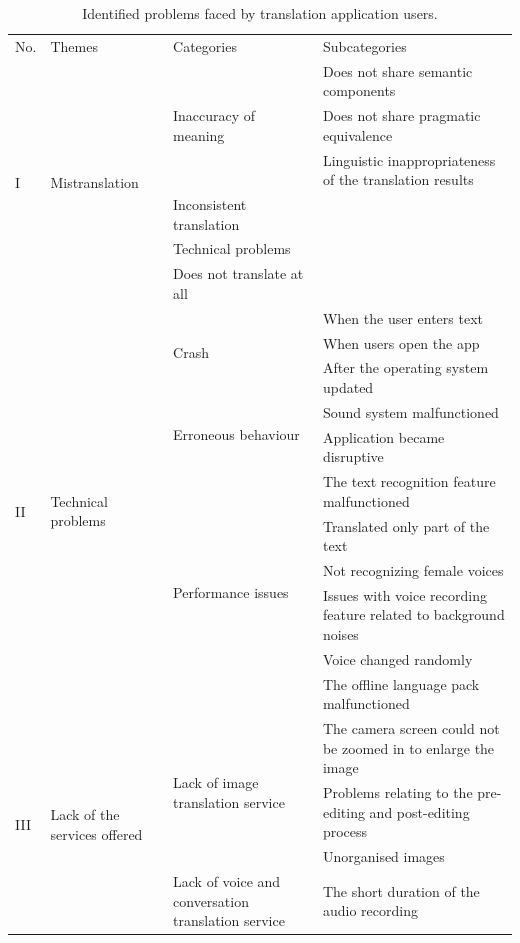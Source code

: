 \documentclass[english]{textolivre}
\begin{document}
\begin{longtable}{p{1cm} p{2.5cm} p{4.5cm} p{5cm}}
\caption{Identified problems faced by translation application users.}
\label{tbl2}
\footnotesize
\\
\toprule
No. & Themes & Categories & Subcategories \\ 
\midrule
\multirow{6}{=}{I} & \multirow{6}{=}{Mistranslation} & \multirow{3}{=}{Inaccuracy of meaning} & Does not share semantic components \\
& & & Does not share pragmatic equivalence \\
& & & Linguistic inappropriateness of the translation results \\
\cmidrule{3-4}
& & Inconsistent translation & \cellcolor[HTML]{EFEFEF} \\
\cmidrule{3-4}
& & Technical problems & \cellcolor[HTML]{EFEFEF} \\
\cmidrule{3-4}
& & Does not translate at all & \cellcolor[HTML]{EFEFEF} \\
\midrule
\multirow{11}{=}{II} & \multirow{11}{=}{Technical problems} & \multirow{3}{=}{Crash} & When the user enters text \\
& & & When users open the app \\
& & & After the operating system updated \\
\cmidrule{3-4}
& & \multirow{2}{=}{Erroneous behaviour} & Sound system malfunctioned \\
& & & Application became disruptive \\
\cmidrule{3-4}
& & \multirow{6}{=}{Performance issues} & The text recognition feature malfunctioned \\
& & & Translated only part of the text \\
& & & Not recognizing female voices \\
& & & Issues with voice recording feature related to background noises \\
& & & Voice changed randomly \\
& & & The offline language pack malfunctioned \\
\midrule
\multirow{9}{=}{III} & \multirow{9}{=}{Lack of the services offered} & \multirow{3}{=}{Lack of image translation service} & The camera screen could not be zoomed in to enlarge the image \\
& & & Problems relating to the pre-editing and post-editing process \\
& & & Unorganised images \\
\cmidrule{3-4}
& & \multirow{3}{=}{Lack of voice and conversation translation service} & The short duration of the audio recording \\

\end{longtable}
\end{document}
